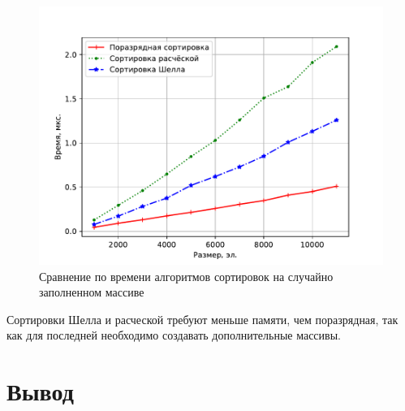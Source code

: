 \begin{figure}[H]
	\centering
	\includegraphics[height=0.4\textheight, page=4]{img/figures.pdf}
	\caption{Сравнение по времени алгоритмов сортировок на случайно заполненном массиве}
	\label{plt:time_04}
\end{figure}

Сортировки Шелла и расческой требуют меньше памяти, чем поразрядная, так как для последней необходимо создавать дополнительные массивы.

\section*{Вывод}
